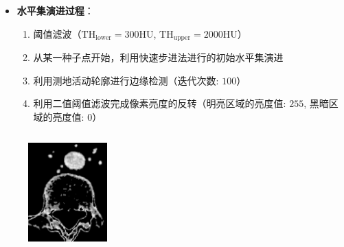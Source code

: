 \begin{frame}
\begin{itemize}
  \item \textbf{水平集演进过程}：
  \begin{enumerate}
     \item 阈值滤波（$\text{TH}_{\text{lower}} = 300\text{HU}$, $\text{TH}_{\text{upper}} = 2000\text{HU}$）
     \item 从某一种子点开始，利用快速步进法进行的初始水平集演进
     \item 利用测地活动轮廓进行边缘检测（迭代次数: $100$）
      \item 利用二值阈值滤波完成像素亮度的反转（明亮区域的亮度值: $255$, 黑暗区域的亮度值: $0$）
  \end{enumerate}
\end{itemize}
\begin{columns}[b,onlytextwidth]
\begin{column}{.25\textwidth}
 \begin{figure}[t]
\centering
\includegraphics[height=1.5in]{../../Figures/gac/dcm_threshold.eps}
\end{figure}
\end{column}
\begin{column}{.25\textwidth}
 \begin{figure}[t]
\centering
\setlength{\fboxrule}{0.1pt}
\setlength{\fboxsep}{0cm}
\end{figure}
\end{column}
\begin{column}{.25\textwidth}
 \begin{figure}[t]

\end{figure}
\end{column}
\end{columns}
\end{frame}
